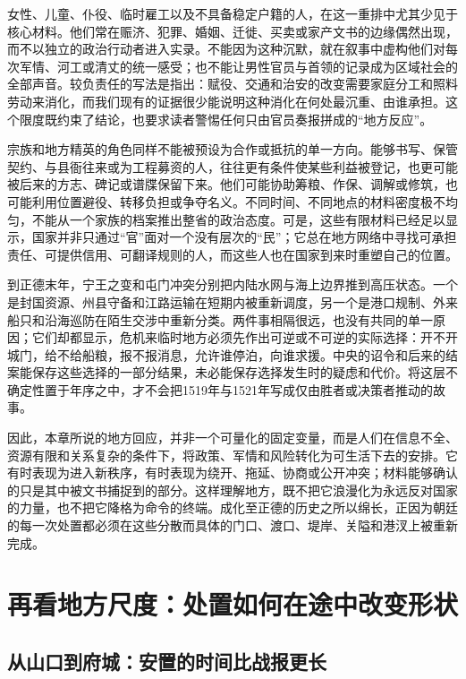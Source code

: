 女性、儿童、仆役、临时雇工以及不具备稳定户籍的人，在这一重排中尤其少见于核心材料。他们常在赈济、犯罪、婚姻、迁徙、买卖或家产文书的边缘偶然出现，而不以独立的政治行动者进入实录。不能因为这种沉默，就在叙事中虚构他们对每次军情、河工或清丈的统一感受；也不能让男性官员与首领的记录成为区域社会的全部声音。较负责任的写法是指出：赋役、交通和治安的改变需要家庭分工和照料劳动来消化，而我们现有的证据很少能说明这种消化在何处最沉重、由谁承担。这个限度既约束了结论，也要求读者警惕任何只由官员奏报拼成的“地方反应”。

宗族和地方精英的角色同样不能被预设为合作或抵抗的单一方向。能够书写、保管契约、与县衙往来或为工程募资的人，往往更有条件使某些利益被登记，也更可能被后来的方志、碑记或谱牒保留下来。他们可能协助筹粮、作保、调解或修筑，也可能利用位置避役、转移负担或争夺名义。不同时间、不同地点的材料密度极不均匀，不能从一个家族的档案推出整省的政治态度。可是，这些有限材料已经足以显示，国家并非只通过“官”面对一个没有层次的“民”；它总在地方网络中寻找可承担责任、可提供信用、可翻译规则的人，而这些人也在国家到来时重塑自己的位置。

到正德末年，宁王之变和屯门冲突分别把内陆水网与海上边界推到高压状态。一个是封国资源、州县守备和江路运输在短期内被重新调度，另一个是港口规制、外来船只和沿海巡防在陌生交涉中重新分类。两件事相隔很远，也没有共同的单一原因；它们却都显示，危机来临时地方必须先作出可逆或不可逆的实际选择：开不开城门，给不给船粮，报不报消息，允许谁停泊，向谁求援。中央的诏令和后来的结案能保存这些选择的一部分结果，未必能保存选择发生时的疑虑和代价。将这层不确定性置于年序之中，才不会把1519年与1521年写成仅由胜者或决策者推动的故事。

因此，本章所说的地方回应，并非一个可量化的固定变量，而是人们在信息不全、资源有限和关系复杂的条件下，将政策、军情和风险转化为可生活下去的安排。它有时表现为进入新秩序，有时表现为绕开、拖延、协商或公开冲突；材料能够确认的只是其中被文书捕捉到的部分。这样理解地方，既不把它浪漫化为永远反对国家的力量，也不把它降格为命令的终端。成化至正德的历史之所以绵长，正因为朝廷的每一次处置都必须在这些分散而具体的门口、渡口、堤岸、关隘和港汊上被重新完成。

\section{再看地方尺度：处置如何在途中改变形状}

\subsection{从山口到府城：安置的时间比战报更长}


